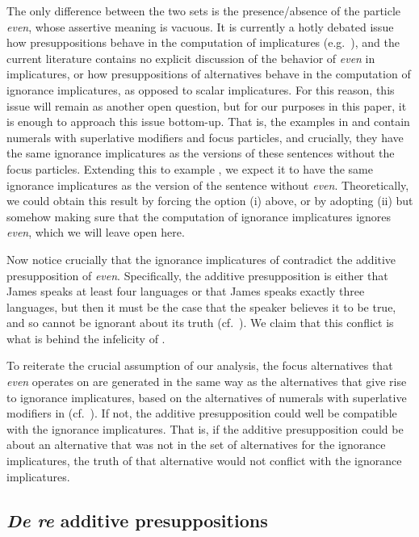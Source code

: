 \documentclass[output=paper]{langscibook}
\begin{document}
\noindent The only difference between the two sets is the presence/absence of the particle \textit{even}, whose assertive meaning is vacuous. It is currently a hotly debated issue how presuppositions behave in the computation of implicatures (e.g.\ \citealt{gajewskisharvit, spectorsudo, marty, anvari}), and the current literature contains no explicit discussion of the behavior of \textit{even} in implicatures, or how presuppositions of alternatives behave in the computation of ignorance implicatures, as opposed to scalar implicatures. For this reason, this issue will remain as another open question, but for our purposes in this paper, it is enough to approach this issue bottom-up. That is, the examples in  and  contain numerals with superlative modifiers and focus particles, and crucially, they have the same ignorance implicatures as the versions of these sentences without the focus particles. Extending this to example , we expect it to have the same ignorance implicatures as the version of the sentence without \textit{even}. Theoretically, we could obtain this result by forcing the option (i) above, or by adopting (ii) but somehow making sure that the computation of ignorance implicatures ignores \textit{even}, which we will leave open here.

Now notice crucially that the ignorance implicatures of  contradict the additive presupposition of \textit{even}. Specifically, the additive presupposition is either that James speaks at least four languages or that James speaks exactly three languages, but then it must be the case that the speaker believes it to be true, and so cannot be ignorant about its truth (cf.\ \citealt{stalnaker}). We claim that this conflict is what is behind the infelicity of .\largerpage

To reiterate the crucial assumption of our analysis, the focus alternatives that \textit{even} operates on are generated in the same way as the alternatives that give rise to ignorance implicatures, based on the alternatives of numerals with superlative modifiers in  (cf.\ \citealt{rooth:92, foxkatzir}). If not, the additive presupposition could well be compatible with the ignorance implicatures. That is, if the additive presupposition could be about an alternative that was not in the set of alternatives for the ignorance implicatures, the truth of that alternative would not conflict with the ignorance implicatures.

\subsection{\textit{De re} additive presuppositions}
\end{document}
